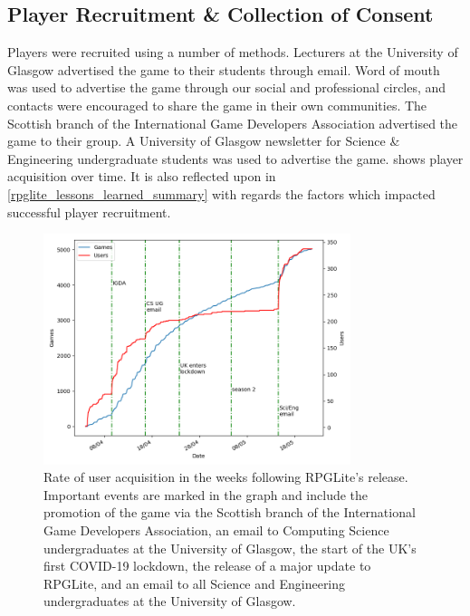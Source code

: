 \subsection{Player Recruitment \& Collection of Consent}
\label{subsec:consent_to_participation}

Players were recruited using a number of methods. Lecturers at the University of
Glasgow advertised the game to their students through email. Word of mouth was
used to advertise the game through our social and professional circles, and
contacts were encouraged to share the game in their own communities. The
Scottish branch of the International Game Developers Association advertised the
game to their group. A University of Glasgow newsletter for Science \&
Engineering undergraduate students was used to advertise the game.
 shows player acquisition over
time. It is also reflected upon in
\cref{rpglite_lessons_learned_summary}
with regards the factors which impacted successful player recruitment. 

\begin{figure}
  \centering
  \includegraphics[width=0.8\textwidth]{50_rpglite/images/user_acquisition.png}
  \caption{Rate of user acquisition in the weeks following RPGLite's release.
  Important events are marked in the graph and include the promotion of the game
  via the Scottish branch of the International Game Developers Association, an
  email to Computing Science undergraduates at the University of Glasgow, the
  start of the UK's first COVID-19 lockdown, the release of a major update to
  RPGLite, and an email to all Science and Engineering undergraduates at the
  University of Glasgow.}
  \label{fig:rpglite_user_acquisition_over_time}
\end{figure}


